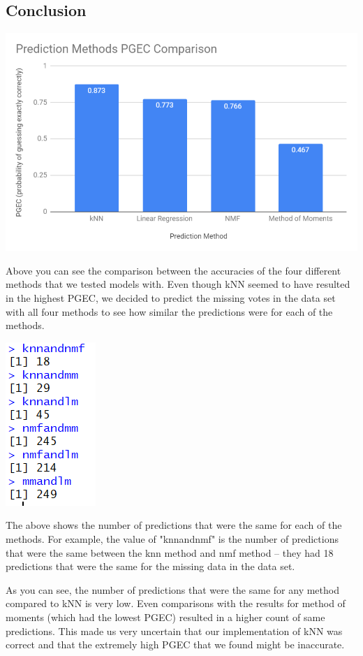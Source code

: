 \documentclass{article}
\begin{document}
\subsection{Conclusion}


\includegraphics[scale = 0.4]{pgeccomparison.png}

Above you can see the comparison between the accuracies of the four different methods that we tested models with. Even though kNN seemed to have resulted in the highest PGEC, we decided to predict the missing votes in the data set with all four methods to see how similar the predictions were for each of the methods.

\includegraphics[scale = 0.6]{comparison.png}

The above shows the number of predictions that were the same for each of the methods. For example, the value of "knnandnmf" is the number of predictions that were the same between the knn method and nmf method -- they had 18 predictions that were the same for the missing data in the data set.

As you can see, the number of predictions that were the same for any method compared to kNN is very low. Even comparisons with the results for method of moments (which had the lowest PGEC) resulted in a higher count of same predictions. This made us very uncertain that our implementation of kNN was correct and that the extremely high PGEC that we found might be inaccurate. 
\end{document}
